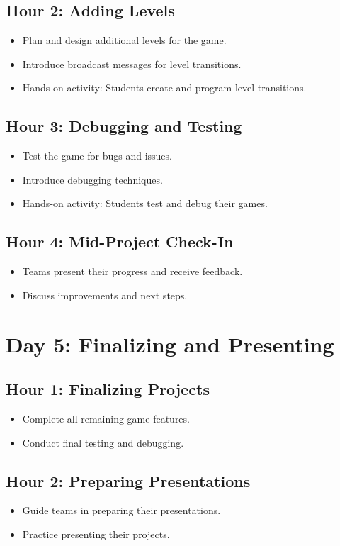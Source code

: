 \documentclass[main.tex]{subfiles}
\begin{document}
\subsection*{Hour 2: Adding Levels}
\begin{itemize}
    \item Plan and design additional levels for the game.
    \item Introduce broadcast messages for level transitions.
    \item Hands-on activity: Students create and program level transitions.
\end{itemize}

\subsection*{Hour 3: Debugging and Testing}
\begin{itemize}
    \item Test the game for bugs and issues.
    \item Introduce debugging techniques.
    \item Hands-on activity: Students test and debug their games.
\end{itemize}

\subsection*{Hour 4: Mid-Project Check-In}
\begin{itemize}
    \item Teams present their progress and receive feedback.
    \item Discuss improvements and next steps.
\end{itemize}

\section*{Day 5: Finalizing and Presenting}
\subsection*{Hour 1: Finalizing Projects}
\begin{itemize}
    \item Complete all remaining game features.
    \item Conduct final testing and debugging.
\end{itemize}

\subsection*{Hour 2: Preparing Presentations}
\begin{itemize}
    \item Guide teams in preparing their presentations.
    \item Practice presenting their projects.
\end{itemize}
\end{document}
